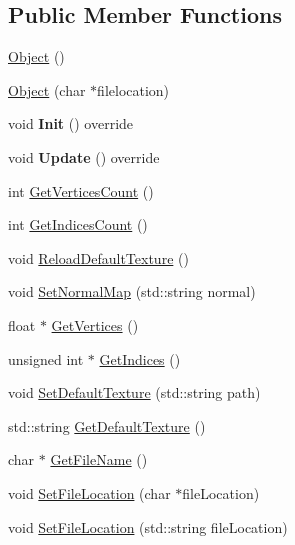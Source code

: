 \subsection*{Public Member Functions}
\begin{DoxyCompactItemize}
\item 
\mbox{\hyperlink{class_object_a40860402e64d8008fb42329df7097cdb}{Object}} ()
\item 
\mbox{\hyperlink{class_object_ab2f2852d5c4d9bf362e8bc41971a0f89}{Object}} (char $\ast$filelocation)
\item 
\mbox{\label{class_object_a3f32fffdbd24eb02bd0de0734087d843}} 
void {\bfseries Init} () override
\item 
\mbox{\label{class_object_a773a2e6ff74418e47e34d603e742dae0}} 
void {\bfseries Update} () override
\item 
int \mbox{\hyperlink{class_object_abc385d340bf88ae42b73b47823ec6de4}{Get\+Vertices\+Count}} ()
\item 
int \mbox{\hyperlink{class_object_a5cec05b7f0e39e610ff6d8bc1e5631bc}{Get\+Indices\+Count}} ()
\item 
void \mbox{\hyperlink{class_object_a1704530eba80bb3693f68356f3e0462b}{Reload\+Default\+Texture}} ()
\item 
void \mbox{\hyperlink{class_object_a0af7bfdeea968eb101c8c4558bd2e349}{Set\+Normal\+Map}} (std\+::string normal)
\item 
float $\ast$ \mbox{\hyperlink{class_object_af4be8aeb3118b253aa4bc9cc449d31c6}{Get\+Vertices}} ()
\item 
unsigned int $\ast$ \mbox{\hyperlink{class_object_a2764a9d62ef5266e17d98038f79fd24e}{Get\+Indices}} ()
\item 
void \mbox{\hyperlink{class_object_a407d49a8187a96845be14ee529c78ab8}{Set\+Default\+Texture}} (std\+::string path)
\item 
std\+::string \mbox{\hyperlink{class_object_a598fffc7b3d107fb5566a31ecb7d48f2}{Get\+Default\+Texture}} ()
\item 
char $\ast$ \mbox{\hyperlink{class_object_aeddce141951f466ad9d6ea4793cde17b}{Get\+File\+Name}} ()
\item 
void \mbox{\hyperlink{class_object_a7720d633ad5c4460867719b97851b11b}{Set\+File\+Location}} (char $\ast$file\+Location)
\item 
void \mbox{\hyperlink{class_object_a1ff1d0e120028e753efc51683379cc3b}{Set\+File\+Location}} (std\+::string file\+Location)

\end{DoxyCompactItemize}
